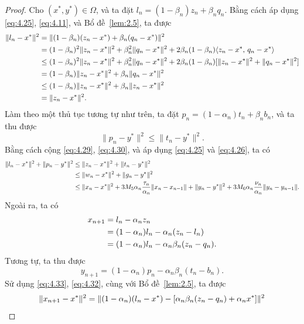 \documentclass[11pt,a4paper]{article}
\theoremstyle{plain}
\theoremstyle{definition}
\theoremstyle{remark}
\numberwithin{equation}{section}
\newcommand{\inp}[2]{\langle #1,\,#2\rangle}
\newcommand{\nm}[1]{\lVert #1\rVert}
\begin{document}
\begin{proof}
Cho $(x^{*},y^{*})\in\Omega$, và ta đặt $l_n=(1-\beta_n)z_n+\beta_n q_n$. Bằng cách áp dụng \eqref{eq:4.25}, \eqref{eq:4.11}, và Bổ đề~\ref{lem:2.5}, ta được
\begin{align}
\nm{l_n-x^{*}}^2 &= \nm{(1-\beta_n)(z_n-x^{*})+\beta_n(q_n-x^{*})}^2\notag\\
&= (1-\beta_n)^2\nm{z_n-x^{*}}^2+\beta_n^2\nm{q_n-x^{*}}^2+2\beta_n(1-\beta_n)\inp{z_n-x^{*}}{q_n-x^{*}}\notag\\
&\le (1-\beta_n)^2\nm{z_n-x^{*}}^2+\beta_n^2\nm{q_n-x^{*}}^2+2\beta_n(1-\beta_n)[\nm{z_n-x^{*}}^2+\nm{q_n-x^{*}}^2]\notag\\
&= (1-\beta_n)\nm{z_n-x^{*}}^2+\beta_n\nm{q_n-x^{*}}^2\notag\\
&\le (1-\beta_n)\nm{z_n-x^{*}}^2+\beta_n\nm{z_n-x^{*}}^2\notag\\
&= \nm{z_n-x^{*}}^2. \label{eq:4.29}
\end{align}
Làm theo một thủ tục tương tự như trên, ta đặt $p_n=(1-\alpha_n)t_n+\beta_n b_n$, và ta thu được
\begin{equation}
\nm{p_n-y^{*}}^2\le\nm{t_n-y^{*}}^2. \label{eq:4.30}
\end{equation}
Bằng cách cộng \eqref{eq:4.29}, \eqref{eq:4.30}, và áp dụng \eqref{eq:4.25} và \eqref{eq:4.26}, ta có
\begin{align}
\nm{l_n-x^{*}}^2+\nm{p_n-y^{*}}^2 &\le \nm{z_n-x^{*}}^2+\nm{t_n-y^{*}}^2\notag\\
&\le \nm{w_n-x^{*}}^2+\nm{g_n-y^{*}}^2\notag\\
&\le \nm{x_n-x^{*}}^2+3M_5\alpha_n\frac{\tau_n}{\alpha_n}\nm{x_n-x_{n-1}}+\nm{y_n-y^{*}}^2+3M_6\alpha_n\frac{\nu_n}{\alpha_n}\nm{y_n-y_{n-1}}. \label{eq:4.31}
\end{align}
Ngoài ra, ta có
\begin{align}
x_{n+1} &= l_n-\alpha_n z_n\notag\\
&= (1-\alpha_n)l_n-\alpha_n(z_n-l_n)\notag\\
&= (1-\alpha_n)l_n-\alpha_n\beta_n(z_n-q_n). \label{eq:4.32}
\end{align}
Tương tự, ta thu được
\begin{equation}
y_{n+1}=(1-\alpha_n)p_n-\alpha_n\beta_n(t_n-b_n). \label{eq:4.33}
\end{equation}
Sử dụng \eqref{eq:4.33}, \eqref{eq:4.32}, cùng với Bổ đề~\ref{lem:2.5}, ta được
\begin{align}
\nm{x_{n+1}-x^{*}}^2 &= \nm{(1-\alpha_n)(l_n-x^{*})-[\alpha_n\beta_n(z_n-q_n)+\alpha_n x^{*}]}^2\notag\\

\end{align}
\end{proof}
\end{document}
